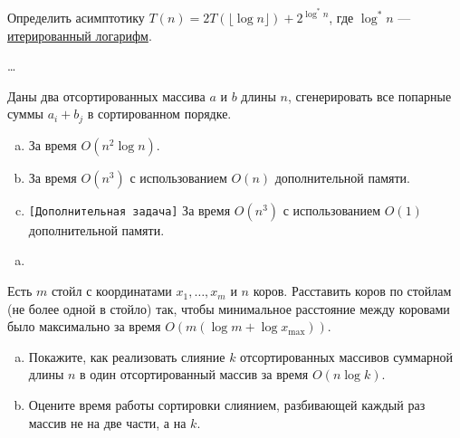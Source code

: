 
\begin{problem}
    Определить асимптотику $T(n) = 2T(\lfloor \log n \rfloor) + 2^{\log^* n}$, где $\log^* n$ ---
    \href{https://en.wikipedia.org/wiki/Iterated_logarithm}{итерированный логарифм}.
\end{problem}

\begin{solution}
    \dots
\end{solution}


\begin{problem}
    Даны два отсортированных массива $a$ и $b$ длины $n$, сгенерировать все попарные суммы $a_i + b_j$
    в сортированном порядке.
    \begin{enumerate}[a)]
        \item За время $O(n^2 \log n)$.
        \item За время $O(n^3)$ с использованием $O(n)$ дополнительной памяти.
        \item \texttt{[Дополнительная задача]} За время $O(n^3)$ с использованием $O(1)$ дополнительной памяти.
    \end{enumerate}
\end{problem}

\begin{solution}
    \leavevmode\vspace{1pt}
    \begin{enumerate}[a)]
        \item
        
    \end{enumerate}
\end{solution}


\begin{problem}
    Есть $m$ стойл с координатами $x_1, \ldots, x_m$ и $n$ коров. Расставить коров по стойлам (не более одной в стойло) так,
    чтобы минимальное расстояние между коровами было максимально за время $O(m (\log{m} + \log{x_{\max}}))$.
\end{problem}

\begin{solution}
    \leavevmode\vspace{1pt}
    
\end{solution}


\begin{problem}
    \leavevmode\vspace{1pt}
    \begin{enumerate}[a)]
        \item Покажите, как реализовать слияние $k$ отсортированных массивов суммарной длины $n$ в один отсортированный массив за время $O(n \log k)$.
        \item Оцените время работы сортировки слиянием, разбивающей каждый раз массив не на две части, а на $k$.
    \end{enumerate}
\end{problem}

